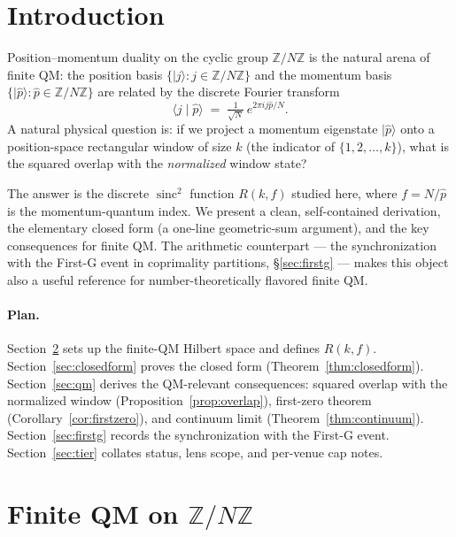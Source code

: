 \documentclass[11pt,reqno]{amsart}
\theoremstyle{plain}
\theoremstyle{definition}
\theoremstyle{remark}
\newcommand{\Z}{\mathbb{Z}}
\DeclareMathOperator{\sinc}{sinc}
\begin{document}
\tableofcontents

\section{Introduction}
\label{sec:intro}

Position--momentum duality on the cyclic group $\Z/N\Z$ is the natural arena of finite QM:
the position basis $\{|j\rangle : j \in \Z/N\Z\}$ and the momentum basis
$\{|\hat p\rangle : \hat p \in \Z/N\Z\}$ are related by the discrete Fourier transform
\[
  \langle j \mid \hat p\rangle \;=\; \tfrac{1}{\sqrt{N}}\, e^{2\pi i j \hat p / N}.
\]
A natural physical question is: if we project a momentum eigenstate $|\hat p\rangle$ onto
a position-space rectangular window of size $k$ (the indicator of $\{1,2,\dots,k\}$), what
is the squared overlap with the \emph{normalized} window state?

The answer is the discrete $\sinc^{2}$ function $R(k,f)$ studied here, where
$f = N/\hat p$ is the momentum-quantum index. We present a clean, self-contained
derivation, the elementary closed form (a one-line geometric-sum argument), and the key
consequences for finite QM. The arithmetic counterpart --- the synchronization with the
First-G event in coprimality partitions, \S\ref{sec:firstg} --- makes this object also a
useful reference for number-theoretically flavored finite QM.

\paragraph{Plan.} Section~\ref{sec:setup} sets up the finite-QM Hilbert space and defines
$R(k,f)$. Section~\ref{sec:closedform} proves the closed form
(Theorem~\ref{thm:closedform}). Section~\ref{sec:qm} derives the QM-relevant
consequences: squared overlap with the normalized window (Proposition~\ref{prop:overlap}),
first-zero theorem (Corollary~\ref{cor:firstzero}), and continuum limit
(Theorem~\ref{thm:continuum}). Section~\ref{sec:firstg} records the synchronization with
the First-G event. Section~\ref{sec:tier} collates status, lens scope, and per-venue cap
notes.

\section{Finite QM on $\Z/N\Z$}
\label{sec:setup}
\end{document}
